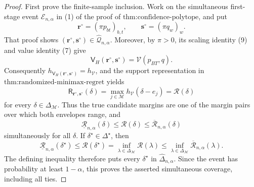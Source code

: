 \documentclass{article}
\begin{document}
\begin{proof}
First prove the finite-sample inclusion.  Work on the simultaneous first-stage event \(\mathcal E_{n,\alpha}\) in (1) of the proof of \(\text{thm:confidence-polytope}\), and put
\[
 \mathbf r^\circ=(\pi p_{bt})_{b,t},\qquad
 \mathbf s^\circ=(\pi q_w)_w.                            \tag{1}
\]
That proof shows \((\mathbf r^\circ,\mathbf s^\circ)\in\widehat{\mathcal Q}_{n,\alpha}\).  Moreover, by \(\pi>0\), its scaling identity (9) and value identity (7) give
\[
 \mathsf V_H(\mathbf r^\circ,\mathbf s^\circ)
 =\mathcal V(p_{BT},q).                                  \tag{2}
\]
Consequently \(h_{\mathsf V_H(\mathbf r^\circ,\mathbf s^\circ)}=h_{\mathcal V}\), and the support representation in \(\text{thm:randomized-minimax-regret}\) yields
\[
 \mathsf R_{\mathbf r^\circ,\mathbf s^\circ}(\delta)
 =\max_{j\in\mathcal M}h_{\mathcal V}(\delta-e_j)
 =\mathcal R(\delta)                                    \tag{3}
\]
for every \(\delta\in\Delta_{\mathcal M}\).  Thus the true candidate margins are one of the margin pairs over which both envelopes range, and
\[
 \underline{\mathcal R}_{n,\alpha}(\delta)
 \le\mathcal R(\delta)
 \le\overline{\mathcal R}_{n,\alpha}(\delta)             \tag{4}
\]
simultaneously for all \(\delta\).  If \(\delta^\star\in\Delta^\star\), then
\[
 \underline{\mathcal R}_{n,\alpha}(\delta^\star)
 \le\mathcal R(\delta^\star)
 =\inf_{\lambda\in\Delta_{\mathcal M}}\mathcal R(\lambda)
 \le\inf_{\lambda\in\Delta_{\mathcal M}}
      \overline{\mathcal R}_{n,\alpha}(\lambda).         \tag{5}
\]
The defining inequality therefore puts every \(\delta^\star\) in \(\widehat{\Delta}_{n,\alpha}\).  Since the event has probability at least \(1-\alpha\), this proves the asserted simultaneous coverage, including all ties.


\end{proof}
\end{document}
